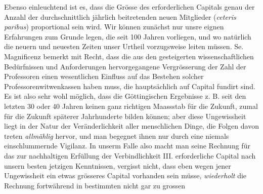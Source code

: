 Ebenso einleuchtend ist es, dass die Grösse des erforderlichen Capitals genau der Anzahl der durchschnittlich jährlich beitretenden neuen Mitglieder (\textit{ceteris paribus}) proportional sein wird. Wir können zunächst nur unsre eignen Erfahrungen zum Grunde legen, die seit 100 Jahren vorliegen, und wo natürlich die neuern und neuesten Zeiten unser Urtheil vorzugsweise leiten müssen. Se. Magnificenz bemerkt mit Recht, dass die aus den gesteigerten wissenschaftlichen Bedürfnissen und Anforderungen hervorgegangene Vergrösserung der Zahl der Professoren einen wesentlichen Einfluss auf das Bestehen solcher Professorenwitwenkassen haben muss, die hauptsächlich auf Capital fundirt sind. Es ist also sehr wohl möglich, dass die Göttingischen Ergebnisse z. B. seit den letzten 30 oder 40 Jahren keinen ganz richtigen Maassstab für die Zukunft, zumal für die Zukunft späterer Jahrhunderte bilden können; aber diese Ungewissheit liegt in der Natur der Veränderlichkeit aller menschlichen Dinge, die Folgen davon treten \textit{allmählig} hervor, und man begegnet ihnen nur durch eine niemals einschlummernde Vigilanz. In unserm Falle also macht man seine Rechnung für das zur nachhaltigen Erfüllung der Verbindlichkeit III. erforderliche Capital nach unsern besten jetzigen Kenntnissen, vergisst nicht, dass eben wegen jener Ungewissheit ein etwas grösseres Capital vorhanden sein müsse, \textit{wiederholt} die Rechnung fortwährend in bestimmten nicht gar zu grossen
